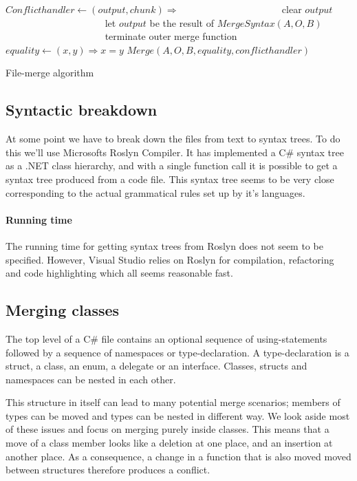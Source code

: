 \documentclass[11pt]{article}
\begin{document}
\begin{algorithm}
\begin{algorithmic}
   \State $Conflicthandler \gets (output, chunk) \Rightarrow$
      \State ~~~~~~~~~~~~~~~~~~~~ clear $output$
      \State ~~~~~~~~~~~~~~~~~~~~ let $output$ be the result of $MergeSyntax(A, O, B)$
      \State ~~~~~~~~~~~~~~~~~~~~ terminate outer merge function
	\State $equality \gets (x, y) \Rightarrow x = y$
	\State \Return $Merge(A, O, B, equality, conflicthandler)$
\EndFunction
\end{algorithmic}
\caption{File-merge algorithm}
  \label{Mainmerge}
\end{algorithm}

\subsection{Syntactic breakdown}
At some point we have to break down the files from text to syntax trees. To do this we'll use Microsofts Roslyn Compiler. It has implemented a C\# syntax tree as a .NET class hierarchy, and with a single function call it is possible to get a syntax tree produced from a code file. This syntax tree seems to be very close corresponding to the actual grammatical rules set up by it's languages.


\paragraph{Running time} The running time for getting syntax trees from Roslyn does not seem to be specified. However, Visual Studio relies on Roslyn for compilation, refactoring and code highlighting which all seems reasonable fast.

\subsection{Merging classes}
\label{mergingclasses}
The top level of a C\# file contains an optional sequence of using-statements followed by a sequence of namespaces or type-declaration. A type-declaration is a struct, a class, an enum, a delegate or an interface. Classes, structs and namespaces can be nested in each other.

This structure in itself can lead to many potential merge scenarios; members of types can be moved and types can be nested in different way. We look aside most of these issues and focus on merging purely inside classes. This means that a move of a class member looks like a deletion at one place, and an insertion at another place. As a consequence, a change in a function that is also moved moved between structures therefore produces a conflict.
\end{document}
